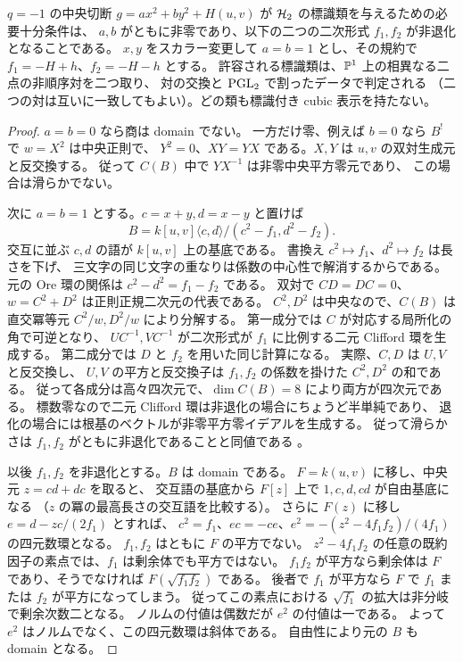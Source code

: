 \begin{theorem}
\label{thm:ore-anticommuting-central}
$q=-1$ の中央切断 $g=a x^2+b y^2+H(u,v)$ が
$\mathcal H_2$ の標識類を与えるための必要十分条件は、
$a,b$ がともに非零であり、以下の二つの二次形式 $f_1,f_2$ が非退化となることである。
$x,y$ をスカラー変更して $a=b=1$ とし、その規約で $f_1=-H+h$、$f_2=-H-h$ とする。
許容される標識類は、$\mathbb P^1$ 上の相異なる二点の非順序対を二つ取り、
対の交換と $\operatorname{PGL}_2$ で割ったデータで判定される
（二つの対は互いに一致してもよい）。どの類も標識付き cubic 表示を持たない。
\end{theorem}

\begin{proof}
$a=b=0$ なら商は domain でない。
一方だけ零、例えば $b=0$ なら $B^!$ で $w=X^2$ は中央正則で、
$Y^2=0$、$XY=YX$ である。$X,Y$ は $u,v$ の双対生成元と反交換する。
従って $C(B)$ 中で $YX^{-1}$ は非零中央平方零元であり、
この場合は滑らかでない。

次に $a=b=1$ とする。$c=x+y,d=x-y$ と置けば
\[
 B=k[u,v]\langle c,d\rangle/(c^2-f_1,d^2-f_2).
\]
交互に並ぶ $c,d$ の語が $k[u,v]$ 上の基底である。
書換え $c^2\mapsto f_1$、$d^2\mapsto f_2$ は長さを下げ、
三文字の同じ文字の重なりは係数の中心性で解消するからである。
元の Ore 環の関係は $c^2-d^2=f_1-f_2$ である。
双対で $CD=DC=0$、$w=C^2+D^2$ は正則正規二次元の代表である。
$C^2,D^2$ は中央なので、$C(B)$ は直交冪等元 $C^2/w,D^2/w$ により分解する。
第一成分では $C$ が対応する局所化の角で可逆となり、
$UC^{-1},VC^{-1}$ が二次形式が $f_1$ に比例する二元 Clifford 環を生成する。
第二成分では $D$ と $f_2$ を用いた同じ計算になる。
実際、$C,D$ は $U,V$ と反交換し、
$U,V$ の平方と反交換子は $f_1,f_2$ の係数を掛けた $C^2,D^2$ の和である。
従って各成分は高々四次元で、$\dim C(B)=8$ により両方が四次元である。
標数零なので二元 Clifford 環は非退化の場合にちょうど半単純であり、
退化の場合には根基のベクトルが非零平方零イデアルを生成する。
従って滑らかさは $f_1,f_2$ がともに非退化であることと同値である
\cite[Lemma 4.13 and Theorem 5.5]{MU2022}。

以後 $f_1,f_2$ を非退化とする。$B$ は domain である。
$F=k(u,v)$ に移し、中央元 $z=cd+dc$ を取ると、
交互語の基底から $F[z]$ 上で $1,c,d,cd$ が自由基底になる
（$z$ の冪の最高長さの交互語を比較する）。
さらに $F(z)$ に移し $e=d-zc/(2f_1)$ とすれば、
$c^2=f_1$、$ec=-ce$、$e^2=-(z^2-4f_1 f_2)/(4f_1)$ の四元数環となる。
$f_1,f_2$ はともに $F$ の平方でない。
$z^2-4f_1 f_2$ の任意の既約因子の素点では、$f_1$ は剰余体でも平方ではない。
$f_1 f_2$ が平方なら剰余体は $F$ であり、そうでなければ $F(\sqrt{f_1 f_2})$ である。
後者で $f_1$ が平方なら $F$ で $f_1$ または $f_2$ が平方になってしまう。
従ってこの素点における $\sqrt{f_1}$ の拡大は非分岐で剰余次数二となる。
ノルムの付値は偶数だが $e^2$ の付値は一である。
よって $e^2$ はノルムでなく、この四元数環は斜体である。
自由性により元の $B$ も domain となる。


\end{proof}

